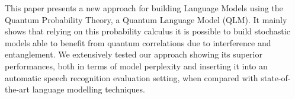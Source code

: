 This paper presents a new approach for building Language Models using the Quantum Probability Theory, a Quantum Language Model (QLM). It mainly shows that relying on this probability calculus it is possible to build stochastic models able to benefit from quantum correlations due to interference and entanglement. We extensively tested our approach showing its superior performances, both in terms of model perplexity and inserting it into an automatic speech recognition evaluation setting, when compared with state-of-the-art language modelling techniques.
